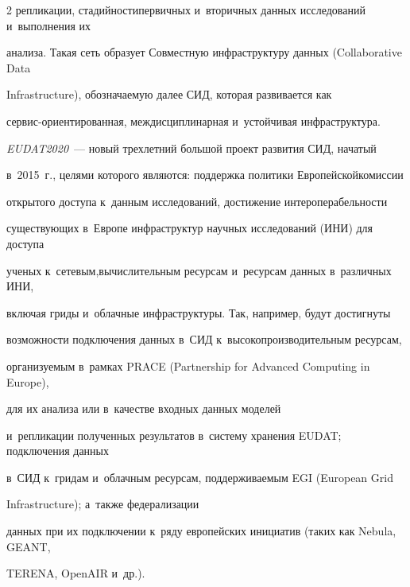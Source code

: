 \begin{multicols}{2}
репликации, ста\-дий\-ности\linebreak первичных и~вторичных данных исследований и~выполнения их 


анализа. Такая сеть образует {Совместную} инфраструктуру данных (Collaborative Data 


Infrastructure), обозначаемую далее СИД, которая развивается как  


сер\-вис-ори\-ен\-ти\-ро\-ван\-ная, междисциплинарная и~устойчивая инфраструктура.


{





}







  


  \textit{EUDAT2020}~--- новый трехлетний большой проект развития СИД, начатый 


в~2015~г., целями которого являются: поддержка политики Европейской\linebreak комиссии 


открытого доступа к~данным исследо\-ваний, достижение интероперабельности 


существующих в~Европе инфраструктур научных исследований (ИНИ) для доступа 


ученых к~сетевым,\linebreak вычислительным ресурсам и~ресурсам данных в~различных ИНИ, 


включая гриды и~облачные инфраструктуры. Так, например, будут достигнуты\linebreak 


возможности подключения данных в~СИД к~высокопроизводительным ресурсам, 


организуемым в~рамках PRACE (Partnership for Advanced Computing in Europe), 


для их анализа или в~качестве входных данных моделей 


и~репликации полученных результатов в~систему хранения EUDAT; подключения данных 


в~СИД к~гридам и~облачным ресурсам, поддерживаемым EGI (European Grid


Infrastructure); а~так\-же федерализации 


данных при их подключении к~ряду европейских инициатив (таких как Nebula, GEANT, 


TERENA, \mbox{OpenAIR} и~др.). 






\end{multicols}
